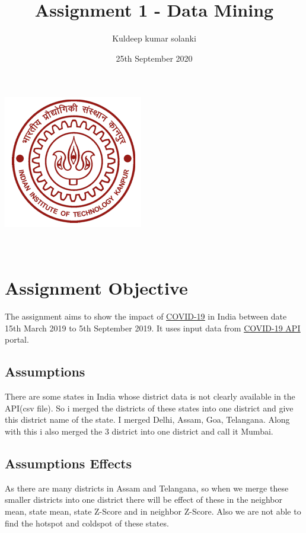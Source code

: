 \documentclass{report}
\title{Assignment 1 - Data Mining}
\author{Kuldeep kumar solanki}
\date{25th September 2020}
\begin{document}
\makeatletter
    \begin{titlepage}
        \begin{center}
            \includegraphics[width=0.7\linewidth]{redlogo}\\[4ex]
            {\huge \bfseries  \@title }\\[2ex] 
            {\LARGE  \@author}\\[50ex] 
            {\large \@date}
        \end{center}
    \end{titlepage}
\makeatother
\thispagestyle{empty}
\newpage

\tableofcontents
\newpage

\section{Assignment Objective}
\justify The assignment aims to show the impact of \href{https://www.covid19india.org/}{\underline{COVID-19}} in India between date 15th March 2019 to 5th September 2019. It uses input data from \href{https://api.covid19india.org/}{\underline{COVID-19 API}} portal.
\subsection{Assumptions}
\justify There are some states in India whose district data is not clearly available in the API(csv file). So i merged the districts of these states into one district and give this district name of the state.
I merged Delhi, Assam, Goa, Telangana. Along with this i also merged the 3 district into one district and call it Mumbai.
\subsection{Assumptions Effects}
\justify As there are many districts in Assam and Telangana, so when we merge these smaller districts into one district there will be effect of these in the neighbor mean, state mean, state Z-Score and in neighbor Z-Score. Also we are not able to find the hotspot and coldspot of these states.
\newpage
\end{document}
